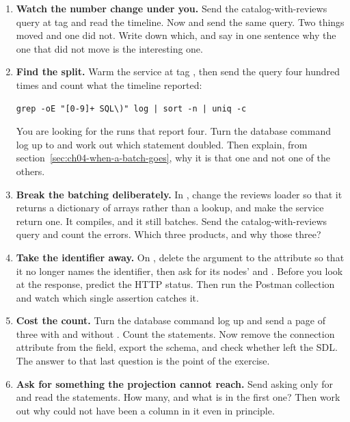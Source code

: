 \begin{enumerate}
  \item \textbf{Watch the number change under you.} Send the
  catalog-with-reviews query at tag  and read the timeline. Now
   and send the same query. Two things moved and one
  did not. Write down which, and say in one sentence why the one that did not
  move is the interesting one.

  \item \textbf{Find the split.} Warm the service at tag , then send
  the query four hundred times and count what the timeline reported:

  \begin{verbatim}
grep -oE "[0-9]+ SQL\)" log | sort -n | uniq -c
  \end{verbatim}

  You are looking for the runs that report four. Turn the database command log
  up to  and work out which statement doubled. Then explain,
  from section~\ref{sec:ch04-when-a-batch-goes}, why it is that one and not one
  of the others.

  \item \textbf{Break the batching deliberately.} In
  , change the reviews loader so that it returns a
  dictionary of arrays rather than a lookup, and make the service return one. It
  compiles, and it still batches. Send the catalog-with-reviews query and count
  the errors. Which three products, and why those three?

  \item \textbf{Take the identifier away.} On , delete
  the argument to the  attribute so that it no longer names the
  identifier, then ask  for its nodes'  and
  . Before you look at the response, predict the HTTP status. Then
  run the Postman collection and watch which single assertion catches it.

  \item \textbf{Cost the count.} Turn the database command log up and send a
  page of three with and without . Count the statements. Now
  remove the connection attribute from the field, export the schema, and check
  whether  left the SDL. The answer to that last question is
  the point of the exercise.

  \item \textbf{Ask for something the projection cannot reach.} Send
   asking only for 
  and read the statements. How many, and what is in the first one? Then work out
  why  could not have been a column in it even in principle.


\end{enumerate}
